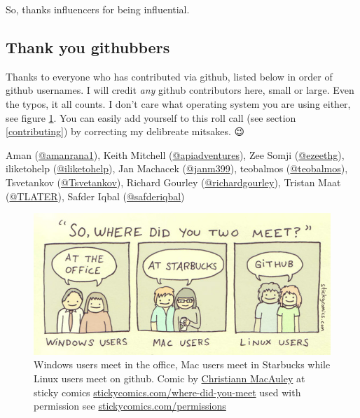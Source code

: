 \documentclass[
]{book}
\begin{document}
So, thanks influencers for being influential. 🙏

\hypertarget{github}{%
\subsection{Thank you githubbers}\label{github}}

Thanks to everyone who has contributed via github, listed below in order of github usernames. I will credit \emph{any} github contributors here, small or large. Even the typos, it all counts. I don't care what operating system you are using either, see figure \ref{fig:sticky-comics-fig}. You can easily add yourself to this roll call (see section \ref{contributing}) by correcting my delibreate mitsakes. 😉

Aman (\href{https://github.com/amanrana1}{@amanrana1}), Keith Mitchell (\href{https://github.com/apiadventures}{@apiadventures}), Zee Somji (\href{https://github.com/ezeethg}{@ezeethg}), iliketohelp (\href{https://github.com/iliketohelp}{@iliketohelp}), Jan Machacek (\href{https://github.com/janm399}{@janm399}), teobalmos (\href{https://github.com/teobalmos}{@teobalmos}), Tsvetankov (\href{https://github.com/Tsvetankov}{@Tsvetankov}), Richard Gourley (\href{https://github.com/richardgourley}{@richardgourley}), Tristan Maat (\href{https://github.com/TLATER}{@TLATER}), Safder Iqbal (\href{https://github.com/safderiqbal}{@safderiqbal})

\begin{figure}

{\centering \includegraphics[width=1\linewidth]{images/os_couples} 

}

\caption{Windows users meet in the office, Mac users meet in Starbucks while Linux users meet on github. Comic by \href{https://www.linkedin.com/in/cmacauley}{Christiann MacAuley} at sticky comics \href{https://www.stickycomics.com/where-did-you-meet/}{stickycomics.com/where-did-you-meet} used with permission see \href{https://www.stickycomics.com/permissions/}{stickycomics.com/permissions}}\label{fig:sticky-comics-fig}
\end{figure}
\end{document}
